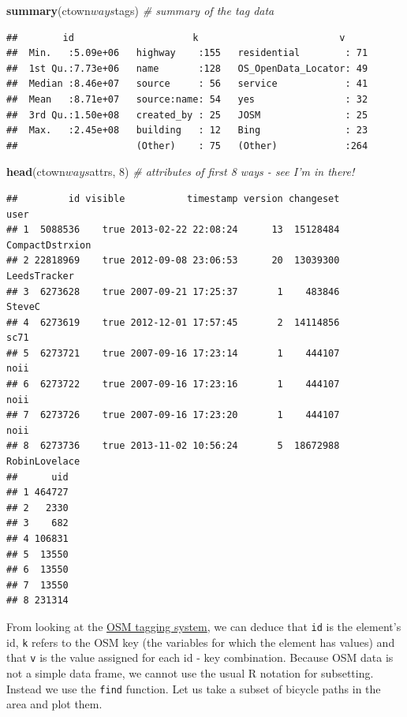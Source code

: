 \documentclass[]{article}
\newenvironment{Shaded}{}{}
\newcommand{\KeywordTok}[1]{\textcolor[rgb]{0.00,0.44,0.13}{\textbf{{#1}}}}
\newcommand{\DecValTok}[1]{\textcolor[rgb]{0.25,0.63,0.44}{{#1}}}
\newcommand{\CommentTok}[1]{\textcolor[rgb]{0.38,0.63,0.69}{\textit{{#1}}}}
\newcommand{\NormalTok}[1]{{#1}}
\begin{document}
\begin{Shaded}
\begin{Highlighting}[]
\KeywordTok{summary}\NormalTok{(ctown$ways$tags)  }\CommentTok{# summary of the tag data}
\end{Highlighting}
\end{Shaded}
\begin{verbatim}
##        id                     k                         v      
##  Min.   :5.09e+06   highway    :155   residential        : 71  
##  1st Qu.:7.73e+06   name       :128   OS_OpenData_Locator: 49  
##  Median :8.46e+07   source     : 56   service            : 41  
##  Mean   :8.71e+07   source:name: 54   yes                : 32  
##  3rd Qu.:1.50e+08   created_by : 25   JOSM               : 25  
##  Max.   :2.45e+08   building   : 12   Bing               : 23  
##                     (Other)    : 75   (Other)            :264
\end{verbatim}
\begin{Shaded}
\begin{Highlighting}[]
\KeywordTok{head}\NormalTok{(ctown$ways$attrs, }\DecValTok{8}\NormalTok{)  }\CommentTok{# attributes of first 8 ways - see I'm in there!}
\end{Highlighting}
\end{Shaded}
\begin{verbatim}
##         id visible           timestamp version changeset            user
## 1  5088536    true 2013-02-22 22:08:24      13  15128484 CompactDstrxion
## 2 22818969    true 2012-09-08 23:06:53      20  13039300    LeedsTracker
## 3  6273628    true 2007-09-21 17:25:37       1    483846          SteveC
## 4  6273619    true 2012-12-01 17:57:45       2  14114856            sc71
## 5  6273721    true 2007-09-16 17:23:14       1    444107            noii
## 6  6273722    true 2007-09-16 17:23:16       1    444107            noii
## 7  6273726    true 2007-09-16 17:23:20       1    444107            noii
## 8  6273736    true 2013-11-02 10:56:24       5  18672988   RobinLovelace
##      uid
## 1 464727
## 2   2330
## 3    682
## 4 106831
## 5  13550
## 6  13550
## 7  13550
## 8 231314
\end{verbatim}
From looking at the \href{http://wiki.openstreetmap.org/wiki/Tags}{OSM
tagging system}, we can deduce that \texttt{id} is the element's id,
\texttt{k} refers to the OSM key (the variables for which the element
has values) and that \texttt{v} is the value assigned for each id - key
combination. Because OSM data is not a simple data frame, we cannot use
the usual R notation for subsetting. Instead we use the \texttt{find}
function. Let us take a subset of bicycle paths in the area and plot
them.
\end{document}
